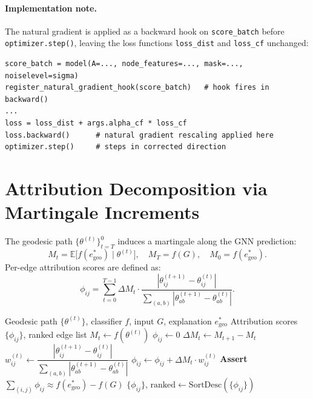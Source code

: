 \documentclass[11pt]{article}
\newcommand{\phil}{\phi_{ij}}
\begin{document}
\paragraph{Implementation note.}
The natural gradient is applied as a backward hook on
\texttt{score\_batch} before \texttt{optimizer.step()}, leaving
the loss functions \texttt{loss\_dist} and \texttt{loss\_cf} unchanged:
\begin{verbatim}
score_batch = model(A=..., node_features=..., mask=..., noiselevel=sigma)
register_natural_gradient_hook(score_batch)   # hook fires in backward()
...
loss = loss_dist + args.alpha_cf * loss_cf
loss.backward()      # natural gradient rescaling applied here
optimizer.step()     # steps in corrected direction
\end{verbatim}


\section{Attribution Decomposition via Martingale Increments}

The geodesic path $\{\theta^{(t)}\}_{t=T}^{0}$ induces a martingale
along the GNN prediction:
\begin{equation}
  M_t = \mathbb{E}\bigl[f(e^*_{\text{geo}}) \mid \theta^{(t)}\bigr],
  \quad M_T = f(G), \quad M_0 = f(e^*_{\text{geo}}).
\end{equation}
Per-edge attribution scores are defined as:
\begin{equation}
  \phil = \sum_{t=0}^{T-1} \Delta M_t \cdot
    \frac{|\theta^{(t+1)}_{ij} - \theta^{(t)}_{ij}|}
         {\sum_{(a,b)}|\theta^{(t+1)}_{ab} - \theta^{(t)}_{ab}|}.
\end{equation}

\begin{algorithm}[H]
\caption{Attribution Decomposition via Geodesic Martingale Increments}
\label{alg:attr}
\begin{algorithmic}[1]
\Require Geodesic path $\{\theta^{(t)}\}$, classifier $f$,
         input $G$, explanation $e^*_{\text{geo}}$
\Ensure Attribution scores $\{\phil\}$, ranked edge list
  \State $M_t \leftarrow f(\theta^{(t)})$
\EndFor
{}
  \State $\phil \leftarrow 0$
    \State $\Delta M_t \leftarrow M_{t+1} - M_t$
    \State $w_{ij}^{(t)} \leftarrow
      \dfrac{|\theta^{(t+1)}_{ij} - \theta^{(t)}_{ij}|}
            {\sum_{(a,b)}|\theta^{(t+1)}_{ab} - \theta^{(t)}_{ab}|}$
    \State $\phil \leftarrow \phil + \Delta M_t \cdot w_{ij}^{(t)}$
  \EndFor
\EndFor
\State \textbf{Assert}\;
  $\textstyle\sum_{(i,j)}\phil \approx f(e^*_{\text{geo}}) - f(G)$
\State \Return $\{\phil\}$,\;
  $\text{ranked} \leftarrow \text{SortDesc}(\{\phil\})$
\end{algorithmic}
\end{algorithm}
\end{document}
